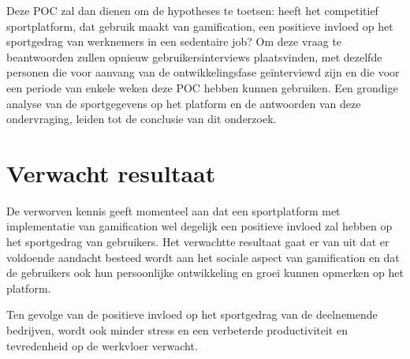 Deze POC zal dan dienen om de hypotheses te toetsen: heeft het competitief sportplatform, dat gebruik maakt van gamification, een positieve invloed op het sportgedrag van werknemers in een sedentaire job? Om deze vraag te beantwoorden zullen opnieuw gebruikersinterviews plaatsvinden, met dezelfde personen die voor aanvang van de ontwikkelingsfase geïnterviewd zijn en die voor een periode van enkele weken deze POC hebben kunnen gebruiken. Een grondige analyse van de sportgegevens op het platform en de antwoorden van deze ondervraging, leiden tot de conclusie van dit onderzoek.

\section{Verwacht resultaat}%
\label{sec:verwachte_resultaten}

De verworven kennis geeft momenteel aan dat een sportplatform met implementatie van gamification wel degelijk een positieve invloed zal hebben op het sportgedrag van gebruikers. Het verwachtte resultaat gaat er van uit dat er voldoende aandacht besteed wordt aan het sociale aspect van gamification en dat de gebruikers ook hun persoonlijke ontwikkeling en groei kunnen opmerken op het platform.

Ten gevolge van de positieve invloed op het sportgedrag van de deelnemende bedrijven, wordt ook minder stress en een verbeterde productiviteit en tevredenheid op de werkvloer verwacht.